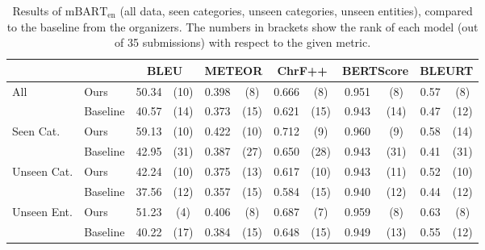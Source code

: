 \begin{table}[t]
    \footnotesize\centering
    \begin{tabular}{llcccccccccc}\toprule
                                     &          & \multicolumn{2}{c}{\bf BLEU} & \multicolumn{2}{c}{\bf METEOR} & \multicolumn{2}{c}{\bf ChrF++} & \multicolumn{2}{c}{\bf BERTScore} & \multicolumn{2}{c}{\bf BLEURT}                                     \\\midrule
        \multirow{2}{*}{All}         & Ours     & 50.34                        & (10)                           & 0.398                          & (8)                               & 0.666                          & (8)  & 0.951 & (8)  & 0.57 & (8)  \\
                                     & Baseline & 40.57                        & (14)                           & 0.373                          & (15)                              & 0.621                          & (15) & 0.943 & (14) & 0.47 & (12) \\\midrule
        \multirow{2}{*}{Seen Cat.}   & Ours     & 59.13                        & (10)                           & 0.422                          & (10)                              & 0.712                          & (9)  & 0.960 & (9)  & 0.58 & (14) \\
                                     & Baseline & 42.95                        & (31)                           & 0.387                          & (27)                              & 0.650                          & (28) & 0.943 & (31) & 0.41 & (31) \\\midrule
        \multirow{2}{*}{Unseen Cat.} & Ours     & 42.24                        & (10)                           & 0.375                          & (13)                              & 0.617                          & (10) & 0.943 & (11) & 0.52 & (10) \\
                                     & Baseline & 37.56                        & (12)                           & 0.357                          & (15)                              & 0.584                          & (15) & 0.940 & (12) & 0.44 & (12) \\\midrule
        \multirow{2}{*}{Unseen Ent.} & Ours     & 51.23                        & (4)                            & 0.406                          & (8)                               & 0.687                          & (7)  & 0.959 & (8)  & 0.63 & (8)  \\
                                     & Baseline & 40.22                        & (17)                           & 0.384                          & (15)                              & 0.648                          & (15) & 0.949 & (13) & 0.55 & (12) \\\bottomrule
    \end{tabular}
    \caption{Results of $\text{mBART}_{\text{en}}$ (all data, seen categories, unseen categories, unseen entities), compared to the baseline from the organizers. The numbers in brackets show the rank of each model (out of 35 submissions) with respect to the given metric.}
    \label{tab:mbart:results-en}
\end{table}

